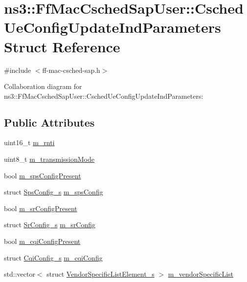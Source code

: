 \hypertarget{structns3_1_1FfMacCschedSapUser_1_1CschedUeConfigUpdateIndParameters}{}\section{ns3\+:\+:Ff\+Mac\+Csched\+Sap\+User\+:\+:Csched\+Ue\+Config\+Update\+Ind\+Parameters Struct Reference}
\label{structns3_1_1FfMacCschedSapUser_1_1CschedUeConfigUpdateIndParameters}


{\ttfamily \#include $<$ff-\/mac-\/csched-\/sap.\+h$>$}



Collaboration diagram for ns3\+:\+:Ff\+Mac\+Csched\+Sap\+User\+:\+:Csched\+Ue\+Config\+Update\+Ind\+Parameters\+:
\subsection*{Public Attributes}
\begin{DoxyCompactItemize}
\item 
uint16\+\_\+t \hyperlink{structns3_1_1FfMacCschedSapUser_1_1CschedUeConfigUpdateIndParameters_a121523f9ad8ccc7c3083924b39910081}{m\+\_\+rnti}
\item 
uint8\+\_\+t \hyperlink{structns3_1_1FfMacCschedSapUser_1_1CschedUeConfigUpdateIndParameters_a86f3ef085ad8bb55a2dfc9f3ab72e703}{m\+\_\+transmission\+Mode}
\item 
bool \hyperlink{structns3_1_1FfMacCschedSapUser_1_1CschedUeConfigUpdateIndParameters_a3d559f8f4e359a33f4a9346f980b6123}{m\+\_\+sps\+Config\+Present}
\item 
struct \hyperlink{structns3_1_1SpsConfig__s}{Sps\+Config\+\_\+s} \hyperlink{structns3_1_1FfMacCschedSapUser_1_1CschedUeConfigUpdateIndParameters_adaa3c0b8e85a202f5163ce8daf794101}{m\+\_\+sps\+Config}
\item 
bool \hyperlink{structns3_1_1FfMacCschedSapUser_1_1CschedUeConfigUpdateIndParameters_ab730e6e71f8049881351f691ba2cb84a}{m\+\_\+sr\+Config\+Present}
\item 
struct \hyperlink{structns3_1_1SrConfig__s}{Sr\+Config\+\_\+s} \hyperlink{structns3_1_1FfMacCschedSapUser_1_1CschedUeConfigUpdateIndParameters_a842141088a73ddd84807639bcc95a41b}{m\+\_\+sr\+Config}
\item 
bool \hyperlink{structns3_1_1FfMacCschedSapUser_1_1CschedUeConfigUpdateIndParameters_a9dcbe0d9e2b8676cb8b08423a63c7927}{m\+\_\+cqi\+Config\+Present}
\item 
struct \hyperlink{structns3_1_1CqiConfig__s}{Cqi\+Config\+\_\+s} \hyperlink{structns3_1_1FfMacCschedSapUser_1_1CschedUeConfigUpdateIndParameters_a939335a0414cf5ce2d2358e1f558818d}{m\+\_\+cqi\+Config}
\item 
std\+::vector$<$ struct \hyperlink{structns3_1_1VendorSpecificListElement__s}{Vendor\+Specific\+List\+Element\+\_\+s} $>$ \hyperlink{structns3_1_1FfMacCschedSapUser_1_1CschedUeConfigUpdateIndParameters_a31d641211714ea927dcb451b7e1cedc7}{m\+\_\+vendor\+Specific\+List}
\end{DoxyCompactItemize}


